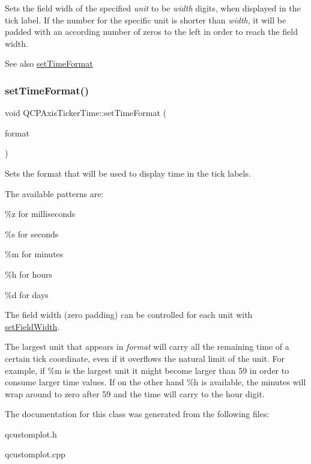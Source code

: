Sets the field widh of the specified {\itshape unit} to be {\itshape width} digits, when displayed in the tick label. If the number for the specific unit is shorter than {\itshape width}, it will be padded with an according number of zeros to the left in order to reach the field width.

\begin{DoxySeeAlso}{See also}
\hyperlink{class_q_c_p_axis_ticker_time_a2f30b6e5125bce4256be9ce3177088ea}{set\+Time\+Format} 
\end{DoxySeeAlso}
\mbox{\label{class_q_c_p_axis_ticker_time_a2f30b6e5125bce4256be9ce3177088ea}} 
\subsubsection{\texorpdfstring{set\+Time\+Format()}{setTimeFormat()}}
{\footnotesize\ttfamily void Q\+C\+P\+Axis\+Ticker\+Time\+::set\+Time\+Format (\begin{DoxyParamCaption}\item[{const Q\+String \&}]{format }\end{DoxyParamCaption})}

Sets the format that will be used to display time in the tick labels.

The available patterns are\+:
\begin{DoxyItemize}
\item \%z for milliseconds
\item \%s for seconds
\item \%m for minutes
\item \%h for hours
\item \%d for days
\end{DoxyItemize}

The field width (zero padding) can be controlled for each unit with \hyperlink{class_q_c_p_axis_ticker_time_adc13e54fc969be98a5c0e3fa0dbaa293}{set\+Field\+Width}.

The largest unit that appears in {\itshape format} will carry all the remaining time of a certain tick coordinate, even if it overflows the natural limit of the unit. For example, if \%m is the largest unit it might become larger than 59 in order to consume larger time values. If on the other hand \%h is available, the minutes will wrap around to zero after 59 and the time will carry to the hour digit. 

The documentation for this class was generated from the following files\+:\begin{DoxyCompactItemize}
\item 
qcustomplot.\+h\item 
qcustomplot.\+cpp\end{DoxyCompactItemize}
